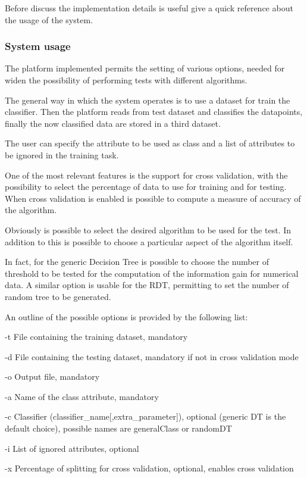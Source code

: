 \documentclass{acm_proc_article-sp-sigmod07}
\begin{document}
Before discuss the implementation details is useful give a quick reference
about the usage of the system.

\subsubsection{System usage}
The platform implemented permits the setting of various options, needed
for widen the possibility of performing tests with different algorithms.

The general way in which the system operates is to use a dataset for train
the classifier. Then the platform reads from test dataset and classifies
the datapoints, finally the now classified data are stored in a third
dataset.

The user can specify the attribute to be used as class and a list of
attributes to be ignored in the training task.

One of the most relevant features is the support for cross validation,
with the possibility to select the percentage of data to use for training
and for testing.
When cross validation is enabled is possible to compute a measure of
accuracy of the algorithm. 

Obviously is possible to select the desired algorithm to be used for the
test. In addition to this is possible to choose a particular aspect of the
algorithm itself.

In fact, for the generic Decision Tree is possible to choose the number of
threshold to be tested for the computation of the information gain for
numerical data.
A similar option is usable for the RDT, permitting to set the number of
random tree to be generated.

An outline of the possible options is provided by the following list:
\begin{description}
\item{-t} File containing the training dataset, mandatory
\item{-d} File containing the testing dataset, mandatory if not in cross
validation mode
\item{-o} Output file, mandatory
\item{-a} Name of the class attribute, mandatory
\item{-c} Classifier (classifier\_name[,extra\_parameter]), optional
(generic DT is the default choice), possible names are generalClass or
randomDT
\item{-i} List of ignored attributes, optional
\item{-x} Percentage of splitting for cross validation, optional, enables
cross validation
\end{description}
\end{document}
